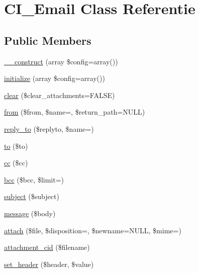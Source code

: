 \hypertarget{class_c_i___email}{}\section{C\+I\+\_\+\+Email Class Referentie}
\label{class_c_i___email}
\subsection*{Public Members}
\begin{DoxyCompactItemize}
\item 
\mbox{\hyperlink{class_c_i___email_a35018c0dc92a448db5c4686364ced754}{\+\_\+\+\_\+construct}} (array \$config=array())
\item 
\mbox{\hyperlink{class_c_i___email_accdda1f75fbf89ca5d63af410e60ee6d}{initialize}} (array \$config=array())
\item 
\mbox{\hyperlink{class_c_i___email_a84399b20dfff67877099743270c68538}{clear}} (\$clear\+\_\+attachments=F\+A\+L\+SE)
\item 
\mbox{\hyperlink{class_c_i___email_adfec40d06e4f3fcae4e2059dee1c26d0}{from}} (\$from, \$name=\textquotesingle{}\textquotesingle{}, \$return\+\_\+path=N\+U\+LL)
\item 
\mbox{\hyperlink{class_c_i___email_a1ee2303dece90d5b3afbb5dc75b9a0ca}{reply\+\_\+to}} (\$replyto, \$name=\textquotesingle{}\textquotesingle{})
\item 
\mbox{\hyperlink{class_c_i___email_a453e853778ae341e4fb165551d1ba1aa}{to}} (\$to)
\item 
\mbox{\hyperlink{class_c_i___email_a785e883837f95eeffed21226563fc7e5}{cc}} (\$cc)
\item 
\mbox{\hyperlink{class_c_i___email_ae7da2abc30865dd8ba3fcb3366889d7a}{bcc}} (\$bcc, \$limit=\textquotesingle{}\textquotesingle{})
\item 
\mbox{\hyperlink{class_c_i___email_aaa61b3aaa6cc4c90e26686e4bf41587a}{subject}} (\$subject)
\item 
\mbox{\hyperlink{class_c_i___email_a62559aacd297073072c30009daa8de86}{message}} (\$body)
\item 
\mbox{\hyperlink{class_c_i___email_adb1bcf392d6cf38e3f94675a21cab563}{attach}} (\$file, \$disposition=\textquotesingle{}\textquotesingle{}, \$newname=N\+U\+LL, \$mime=\textquotesingle{}\textquotesingle{})
\item 
\mbox{\hyperlink{class_c_i___email_afd601b1ddbb0fc02f16f2e39d9881299}{attachment\+\_\+cid}} (\$filename)
\item 
\mbox{\hyperlink{class_c_i___email_aff40701d50f18c87942be79f8b447247}{set\+\_\+header}} (\$header, \$value)

\end{DoxyCompactItemize}

